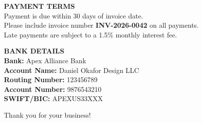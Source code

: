 \documentclass[10pt,letterpaper]{article}
\begin{document}
\begin{minipage}[t]{0.5\textwidth}
    \vspace{0pt}
    {\color{accent}\bfseries\small PAYMENT TERMS} \\[1.5mm]
    {\color{mutedneutral}\small
    Payment is due within 30 days of invoice date. \\
    Please include invoice number \textbf{INV-2026-0042} on all payments. \\
    Late payments are subject to a 1.5\% monthly interest fee.
    }
\end{minipage}%
\begin{minipage}[t]{0.5\textwidth}
    \vspace{0pt}
    \raggedleft
    {\color{accent}\bfseries\small BANK DETAILS} \\[1.5mm]
    {\color{mutedneutral}\small
    \textbf{Bank:} Apex Alliance Bank \\
    \textbf{Account Name:} Daniel Okafor Design LLC \\
    \textbf{Routing Number:} 123456789 \\
    \textbf{Account Number:} 9876543210 \\
    \textbf{SWIFT/BIC:} APEXUS33XXX
    }
\end{minipage}

\vspace{5mm}
\begin{center}
    {\color{mutedneutral}\small Thank you for your business!}
\end{center}
\end{document}
